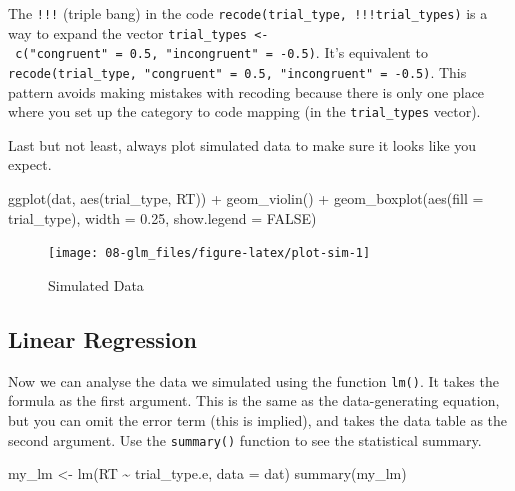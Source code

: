 \documentclass[
  oneside]{book}
\newenvironment{Shaded}{\begin{snugshade}}{\end{snugshade}}
\newcommand{\AttributeTok}[1]{\textcolor[rgb]{0.77,0.63,0.00}{#1}}
\newcommand{\ConstantTok}[1]{\textcolor[rgb]{0.00,0.00,0.00}{#1}}
\newcommand{\FloatTok}[1]{\textcolor[rgb]{0.00,0.00,0.81}{#1}}
\newcommand{\FunctionTok}[1]{\textcolor[rgb]{0.00,0.00,0.00}{#1}}
\newcommand{\NormalTok}[1]{#1}
\newcommand{\OtherTok}[1]{\textcolor[rgb]{0.56,0.35,0.01}{#1}}
\newcommand{\SpecialCharTok}[1]{\textcolor[rgb]{0.00,0.00,0.00}{#1}}
\begin{document}
\begin{info}
The \texttt{!!!} (triple bang) in the code \texttt{recode(trial\_type,\ !!!trial\_types)} is a way to expand the vector \texttt{trial\_types\ \textless{}-\ c("congruent"\ =\ 0.5,\ "incongruent"\ =\ -0.5)}. It's equivalent to \texttt{recode(trial\_type,\ "congruent"\ =\ 0.5,\ "incongruent"\ =\ -0.5)}. This pattern avoids making mistakes with recoding because there is only one place where you set up the category to code mapping (in the \texttt{trial\_types} vector).

\end{info}

Last but not least, always plot simulated data to make sure it looks like you expect.

\begin{Shaded}
\begin{Highlighting}[]
\FunctionTok{ggplot}\NormalTok{(dat, }\FunctionTok{aes}\NormalTok{(trial\_type, RT)) }\SpecialCharTok{+} 
  \FunctionTok{geom\_violin}\NormalTok{() }\SpecialCharTok{+}
  \FunctionTok{geom\_boxplot}\NormalTok{(}\FunctionTok{aes}\NormalTok{(}\AttributeTok{fill =}\NormalTok{ trial\_type), }
               \AttributeTok{width =} \FloatTok{0.25}\NormalTok{, }\AttributeTok{show.legend =} \ConstantTok{FALSE}\NormalTok{)}
\end{Highlighting}
\end{Shaded}

\begin{figure}

{\centering \texttt{[image: 08-glm\_files/figure-latex/plot-sim-1]} 

}

\caption{Simulated Data}\label{fig:plot-sim}
\end{figure}

\hypertarget{linear-regression}{%
\subsection{Linear Regression}\label{linear-regression}}

Now we can analyse the data we simulated using the function \texttt{lm()}. It takes the formula as the first argument. This is the same as the data-generating equation, but you can omit the error term (this is implied), and takes the data table as the second argument. Use the \texttt{summary()} function to see the statistical summary.

\begin{Shaded}
\begin{Highlighting}[]
\NormalTok{my\_lm }\OtherTok{\textless{}{-}} \FunctionTok{lm}\NormalTok{(RT }\SpecialCharTok{\textasciitilde{}}\NormalTok{ trial\_type.e, }\AttributeTok{data =}\NormalTok{ dat)}
\FunctionTok{summary}\NormalTok{(my\_lm)}
\end{Highlighting}
\end{Shaded}
\end{document}
